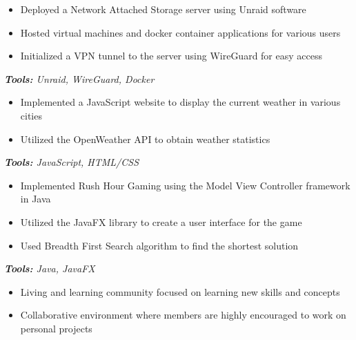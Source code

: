 \documentclass[10pt,letter]{altacv}
\begin{document}
\divider

\begin{itemize}
  \item Deployed a Network Attached Storage server using Unraid software
  \item Hosted virtual machines and docker container applications for various users  
  \item Initialized a VPN tunnel to the server using WireGuard for easy access
\end{itemize}
\textit{\textbf{Tools:} Unraid, WireGuard, Docker}

\divider

\begin{itemize}
  \item Implemented a JavaScript website to display the current weather in various cities
  \item Utilized the OpenWeather API to obtain weather statistics 
\end{itemize}
\textit{\textbf{Tools:} JavaScript, HTML/CSS}

\divider

\begin{itemize}
  \item Implemented Rush Hour Gaming using the Model View Controller framework in Java
  \item Utilized the JavaFX library to create a user interface for the game
  \item Used Breadth First Search algorithm to find the shortest solution
\end{itemize}
\textit{\textbf{Tools:} Java, JavaFX}

\smallskip


\begin{itemize}
  \item Living and learning community focused on learning new skills and concepts
  \item Collaborative environment where members are highly encouraged to work on personal projects
\end{itemize}

\end{document}
